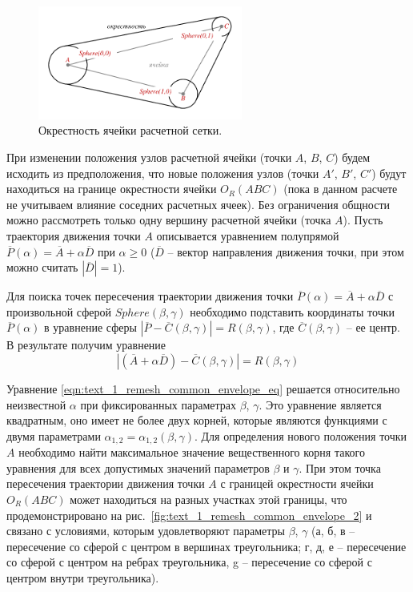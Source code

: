\begin{figure}[ht]
\centering
\includegraphics[width=0.6\textwidth]{fig/3dr_triangle.pdf}
\singlespacing
{}\caption{Окрестность ячейки расчетной сетки.}
\label{fig:text_1_remesh_common_envelope_1}
\end{figure}

При изменении положения узлов расчетной ячейки (точки $A$, $B$, $C$) будем исходить из предположения, что новые положения узлов (точки $A'$, $B'$, $C'$) будут находиться на границе окрестности ячейки $O_R(ABC)$ (пока в данном расчете не учитываем влияние соседних расчетных ячеек).
Без ограничения общности можно рассмотреть только одну вершину расчетной ячейки (точка $A$).
Пусть траектория движения точки $A$ описывается уравнением полупрямой $\overline{P}(\alpha) = \overline{A} + \alpha \overline{D}$ при $\alpha \ge 0$ ($\overline{D}$ -- вектор направления движения точки, при этом можно считать $|\overline{D}| = 1$).

Для поиска точек пересечения траектории движения точки $\overline{P}(\alpha) = \overline{A} + \alpha \overline{D}$ с 
произвольной сферой $Sphere(\beta,\gamma)$ необходимо подставить координаты точки $\overline{P}(\alpha)$ в уравнение сферы $|\overline{P} - \overline{C}(\beta,\gamma)| = R(\beta,\gamma)$, где $\overline{C}(\beta,\gamma)$ -- ее центр.
В результате получим уравнение
\begin{equation}\label{eqn:text_1_remesh_common_envelope_eq}
	|(\overline{A} + \alpha \overline{D}) - \overline{C}(\beta, \gamma)| = R(\beta, \gamma)
\end{equation}

Уравнение \eqref{eqn:text_1_remesh_common_envelope_eq} решается относительно неизвестной $\alpha$ при фиксированных параметрах $\beta$, $\gamma$.
Это уравнение является квадратным, оно имеет не более двух корней, которые являются функциями с двумя параметрами $\alpha_{1,2} = \alpha_{1,2}(\beta,\gamma)$.
Для определения нового положения точки $A$ необходимо найти максимальное значение вещественного корня такого уравнения для всех допустимых значений параметров $\beta$ и $\gamma$.
При этом точка пересечения траектории движения точки $A$ с границей окрестности ячейки $O_R(ABC)$ может находиться на разных участках этой границы, что продемонстрировано на рис.~\ref{fig:text_1_remesh_common_envelope_2} и связано с условиями, которым удовлетворяют параметры $\beta$, $\gamma$ (а, б, в -- пересечение со сферой с центром в вершинах треугольника; г, д, е -- пересечение со сферой с центром на ребрах треугольника, g -- пересечение со сферой с центром внутри треугольника).


